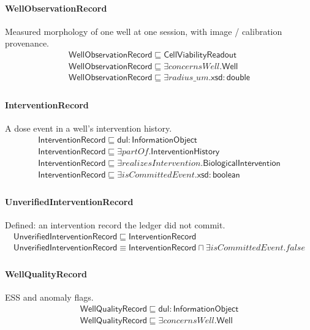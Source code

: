 \documentclass[10pt]{article}
\begin{document}
\paragraph{WellObservationRecord} Measured morphology of one well at one session, with image / calibration provenance.
\[\begin{array}{l}
\mathsf{WellObservationRecord} \sqsubseteq  \mathsf{CellViabilityReadout} \\
\mathsf{WellObservationRecord} \sqsubseteq  \exists \mathit{concernsWell}.\mathsf{Well} \\
\mathsf{WellObservationRecord} \sqsubseteq  \exists \mathit{radius\_um}.\mathsf{xsd{:}double} \\
\end{array}\]
\paragraph{InterventionRecord} A dose event in a well's intervention history.
\[\begin{array}{l}
\mathsf{InterventionRecord} \sqsubseteq  \mathsf{dul{:}InformationObject} \\
\mathsf{InterventionRecord} \sqsubseteq  \exists \mathit{partOf}.\mathsf{InterventionHistory} \\
\mathsf{InterventionRecord} \sqsubseteq  \exists \mathit{realizesIntervention}.\mathsf{BiologicalIntervention} \\
\mathsf{InterventionRecord} \sqsubseteq  \exists \mathit{isCommittedEvent}.\mathsf{xsd{:}boolean} \\
\end{array}\]
\paragraph{UnverifiedInterventionRecord} Defined: an intervention record the ledger did not commit.
\[\begin{array}{l}
\mathsf{UnverifiedInterventionRecord} \sqsubseteq  \mathsf{InterventionRecord} \\
\mathsf{UnverifiedInterventionRecord} \equiv  \mathsf{InterventionRecord} \sqcap  \exists \mathit{isCommittedEvent}.{false} \\
\end{array}\]
\paragraph{WellQualityRecord} ESS and anomaly flags.
\[\begin{array}{l}
\mathsf{WellQualityRecord} \sqsubseteq  \mathsf{dul{:}InformationObject} \\
\mathsf{WellQualityRecord} \sqsubseteq  \exists \mathit{concernsWell}.\mathsf{Well} \\
\end{array}\]
\end{document}
